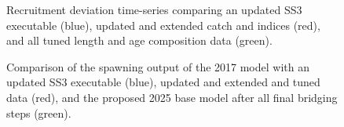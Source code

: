 \documentclass[
]{scrartcl}
\begin{document}
\begin{figure}


\caption{\label{fig-bridge14-comp11}Recruitment deviation time-series
comparing an updated SS3 executable (blue), updated and extended catch
and indices (red), and all tuned length and age composition data
(green).}

\end{figure}%

\begin{figure}


\caption{\label{fig-bridge19-comp2}Comparison of the spawning output of
the 2017 model with an updated SS3 executable (blue), updated and
extended and tuned data (red), and the proposed 2025 base model after
all final bridging steps (green).}

\end{figure}%
\end{document}
